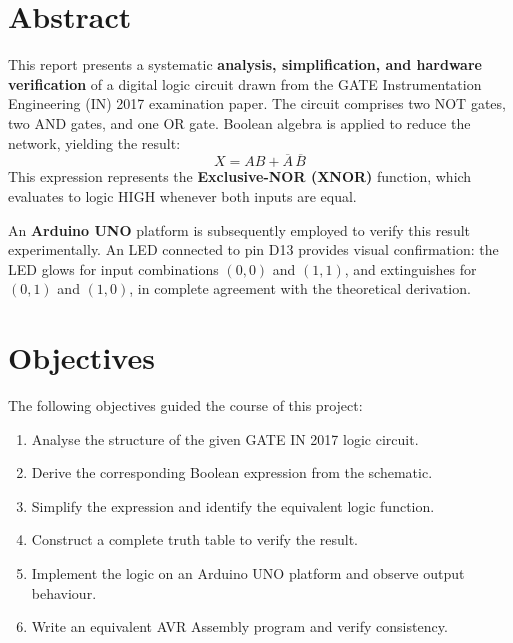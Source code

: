 \documentclass[12pt,a4paper]{article}
\begin{document}
\tableofcontents
\newpage

\section{Abstract}

\begin{tcolorbox}[abstractbox, title={Overview}]
This report presents a systematic \textbf{analysis, simplification, and hardware
verification} of a digital logic circuit drawn from the GATE Instrumentation
Engineering (IN) 2017 examination paper. The circuit comprises two NOT gates,
two AND gates, and one OR gate. Boolean algebra is applied to reduce the
network, yielding the result:
\[
\boxed{X = AB + \overline{A}\,\overline{B}}
\]
This expression represents the \textbf{Exclusive-NOR (XNOR)} function, which
evaluates to logic HIGH whenever both inputs are equal.

An \textbf{Arduino UNO} platform is subsequently employed to verify this result
experimentally. An LED connected to pin D13 provides visual confirmation:
the LED glows for input combinations $(0,0)$ and $(1,1)$, and extinguishes for
$(0,1)$ and $(1,0)$, in complete agreement with the theoretical derivation.
\end{tcolorbox}

\section{Objectives}

The following objectives guided the course of this project:

\begin{enumerate}[label=\textcolor{accentblue}{\textbf{\arabic*.}}, leftmargin=*, itemsep=4pt]
    \item Analyse the structure of the given GATE IN 2017 logic circuit.
    \item Derive the corresponding Boolean expression from the schematic.
    \item Simplify the expression and identify the equivalent logic function.
    \item Construct a complete truth table to verify the result.
    \item Implement the logic on an Arduino UNO platform and observe output behaviour.
    \item Write an equivalent AVR Assembly program and verify consistency.
\end{enumerate}
\end{document}
